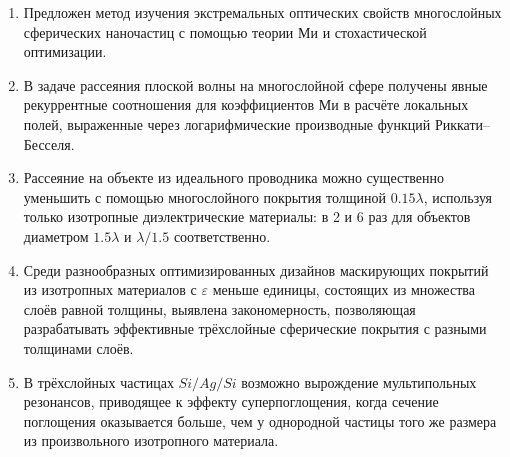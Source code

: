 {}  %
\mynobreakpar\begin{enumerate}
  \item Предложен метод изучения экстремальных оптических свойств
    многослойных сферических наночастиц с помощью теории Ми и
    стохастической оптимизации.
  \item В задаче рассеяния плоской волны на многослойной сфере
    получены явные рекуррентные соотношения для коэффициентов Ми в
    расчёте локальных полей, выраженные через логарифмические
    производные функций Риккати--Бесселя. %
  \item Рассеяние на объекте из идеального проводника можно
    существенно уменьшить с помощью многослойного покрытия толщиной
    $0.15\lambda$, используя только изотропные диэлектрические
    материалы: в 2 и 6 раз для объектов диаметром $1.5\lambda$ и
    $\lambda/1.5$ соответственно.
  \item %
    Среди разнообразных оптимизированных дизайнов маскирующих покрытий из
    изотропных материалов с $\varepsilon$ меньше единицы, состоящих из
    множества слоёв равной толщины, выявлена закономерность,
    позволяющая разрабатывать эффективные трёхслойные сферические
    покрытия с разными толщинами слоёв. %


  \item В трёхслойных частицах $Si/Ag/Si$ возможно вырождение
    мультипольных резонансов, приводящее к эффекту суперпоглощения,
    когда сечение поглощения оказывается больше, чем у однородной
    частицы того же размера из произвольного изотропного материала.
\end{enumerate}


